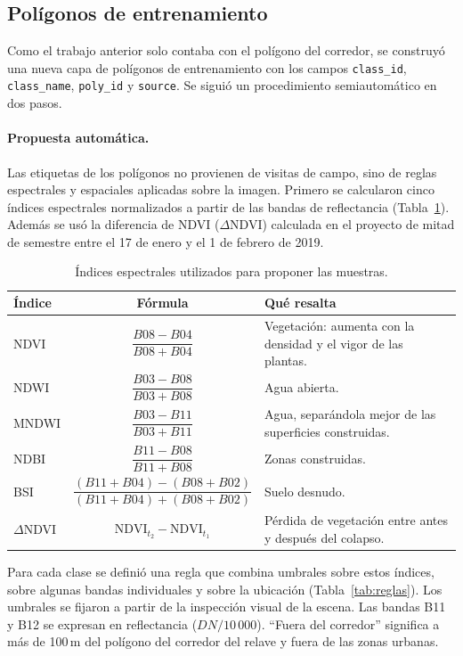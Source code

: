\documentclass{article}
\begin{document}
\subsection{Polígonos de entrenamiento}
Como el trabajo anterior solo contaba con el polígono del corredor, se construyó una nueva capa de polígonos de entrenamiento con los campos \texttt{class\_id}, \texttt{class\_name}, \texttt{poly\_id} y \texttt{source}. Se siguió un procedimiento semiautomático en dos pasos.

\paragraph{Propuesta automática.}
Las etiquetas de los polígonos no provienen de visitas de campo, sino de reglas espectrales y espaciales aplicadas sobre la imagen. Primero se calcularon cinco índices espectrales normalizados a partir de las bandas de reflectancia (Tabla~\ref{tab:indices}). Además se usó la diferencia de NDVI ($\Delta$NDVI) calculada en el proyecto de mitad de semestre entre el 17 de enero y el 1 de febrero de 2019.

\begin{table}[htbp]
 \centering
 \small
 \caption{Índices espectrales utilizados para proponer las muestras.}
 \label{tab:indices}
 \begin{tabularx}{\textwidth}{lcX}
  \toprule
  Índice & Fórmula & Qué resalta \\
  \midrule
  NDVI \parencite{Rouse1974} & $\dfrac{B08 - B04}{B08 + B04}$ & Vegetación: aumenta con la densidad y el vigor de las plantas. \\[8pt]
  NDWI \parencite{McFeeters1996} & $\dfrac{B03 - B08}{B03 + B08}$ & Agua abierta. \\[8pt]
  MNDWI \parencite{Xu2006} & $\dfrac{B03 - B11}{B03 + B11}$ & Agua, separándola mejor de las superficies construidas. \\[8pt]
  NDBI \parencite{Zha2003} & $\dfrac{B11 - B08}{B11 + B08}$ & Zonas construidas. \\[8pt]
  BSI \parencite{Rikimaru2002} & $\dfrac{(B11 + B04) - (B08 + B02)}{(B11 + B04) + (B08 + B02)}$ & Suelo desnudo. \\[8pt]
  $\Delta$NDVI & $\mathrm{NDVI}_{t_2} - \mathrm{NDVI}_{t_1}$ & Pérdida de vegetación entre antes y después del colapso. \\
  \bottomrule
 \end{tabularx}
\end{table}

Para cada clase se definió una regla que combina umbrales sobre estos índices, sobre algunas bandas individuales y sobre la ubicación (Tabla~\ref{tab:reglas}). Los umbrales se fijaron a partir de la inspección visual de la escena. Las bandas B11 y B12 se expresan en reflectancia ($DN/10\,000$). \enquote{Fuera del corredor} significa a más de 100\,m del polígono del corredor del relave y fuera de las zonas urbanas.
\end{document}
